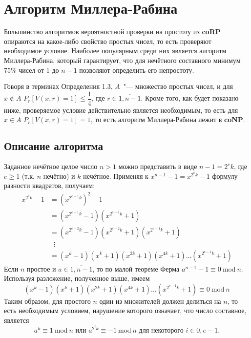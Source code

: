 \documentclass[12pt]{article}
\theoremstyle{definition}
\numberwithin{Def}{section}
\numberwithin{Th}{section}
\numberwithin{St}{section}
\numberwithin{Cor}{section}
\begin{document}
\section{Алгоритм Миллера-Рабина}

Большинство алгоритмов вероятностной проверки на простоту из \textbf{coRP}
опираются на какое-либо свойство простых чисел, то есть проверяют необходимое
условие. Наиболее популярным среди них является алгоритм Миллера-Рабина, который
гарантирует, что для нечётного составного минимум $75\%$ чисел от $1$ до $n-1$
позволяют определить его непростоту.

Говоря в терминах Определения 1.3,
$A$~"--- множество простых чисел, и для
$x\notin A$ $P_r[V(x,r)=1]\leqslant\dfrac 14$, где $r\in\overline{1,n-1}$.
Кроме того, как будет показано ниже, проверяемое условие действительно
является необходимым, то есть для $x\in A$ $P_r[V(x,r)=1]=1$, то есть
алгоритм Миллера-Рабина лежит в \textbf{coNP}.

\subsection{Описание алгоритма}
\newcommand{\Mod}[1]{\ \mathrm{mod}\ #1}

Заданное нечётное целое число $n>1$ можно представить в виде $n-1=2^ek$,
где $e\geqslant 1$ (т.к. $n$ нечётно) и $k$ нечётное. Применяя к
$x^{n-1}-1=x^{2^ek}-1$ формулу разности квадратов, получаем:
\begin{align*}
	x^{2^ek}-1&=\left(x^{2^{e-1}k}\right)^2-1 \\
	&=\left(x^{2^{e-1}k}-1\right)\left(x^{2^{e-1}k}+1\right) \\
	&=\left(x^{2^{e-2}k}-1\right)\left(x^{2^{e-2}k}+1\right)
	\left(x^{2^{e-1}k}+1\right) \\
	&\;\;\vdots \\
	&=\left(x^k-1\right)\left(x^k+1\right)\left(x^{2k}+1\right)
	\left(x^{4k}+1\right)\ldots\left(x^{2^{e-1}k}+1\right)
\end{align*}
Если $n$ простое и $a\in\overline{1,n-1}$, то
по малой теореме Ферма $a^{n-1}-1\equiv 0\Mod{n}$. Используя разложение,
полученное выше, имеем
$$
\left(x^k-1\right)\left(x^k+1\right)\left(x^{2k}+1\right)
	\left(x^{4k}+1\right)\ldots\left(x^{2^{e-1}k}+1\right)\equiv 0\Mod{n}
$$
Таким образом, для простого $n$ один из множителей должен делиться на $n$,
то есть необходимым условием, нарушение которого означает, что число составное,
является
$$
a^k\equiv 1\Mod{n}\text{ или } a^{2^ik}\equiv -1\Mod{n} \text{ для некоторого } 
i\in\overline{0,e-1}.
$$
\end{document}
